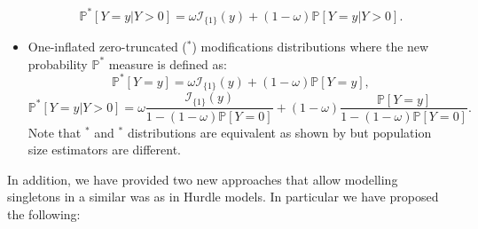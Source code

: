 \documentclass[
]{jss}
\newcommand{\1}{\mathcal{I}} \newcommand{\bZero}{\boldsymbol{0}}
\begin{document}
\begin{itemize}
    \begin{equation*}
        \mathbb{P}^{\ast}[Y=y|Y>0]=\omega\mathcal{I}_{\{1\}}(y)+(1-\omega)\mathbb{P}[Y=y|Y>0].
    \end{equation*}
    \item One-inflated zero-truncated ($^\ast$) modifications distributions where the new probability $\mathbb{P}^{\ast}$ measure is defined as:
    \begin{equation*}
        \mathbb{P}^{\ast}[Y=y] = \omega \mathcal{I}_{\{1\}}(y)+(1-\omega)\mathbb{P}[Y=y],
    \end{equation*}
    \begin{equation*}
        \mathbb{P}^{\ast}[Y=y|Y>0] = 
        \omega\frac{\mathcal{I}_{\{1\}}(y)}{1-(1-\omega)\mathbb{P}[Y=0]}+
        (1-\omega)\frac{\mathbb{P}[Y=y]}{1-(1-\omega)\mathbb{P}[Y=0]}.
    \end{equation*}
    Note that $^\ast$ and $^\ast$ distributions are equivalent as shown by \cite{bohning2023equivalence} but population size estimators are different.
\end{itemize}

In addition, we have provided two new approaches that allow modelling
singletons in a similar was as in Hurdle models. In particular we have
proposed the following:
\end{document}
